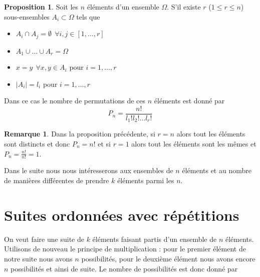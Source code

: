 \documentclass[a4paper,12pt]{report}
\theoremstyle{definition}
\renewcommand{\(}{\left(}
\renewcommand{\)}{\right)}
\newtheorem{rmk}[thm]{Remarque}
\newtheorem{prop}[thm]{Proposition}
\begin{document}
        \begin{leftbar}
        \begin{prop}
            Soit les $n$ éléments d'un ensemble $\Omega$. S'il existe $r$ ($1\leq r\leq n$) sous-ensembles $A_i\subset\Omega$ tels que 
            \begin{itemize}[label = \textbullet]
                \item $A_i\cap A_j = \emptyset~~ \forall i,j\in[1,\dots, r]$
                \item $A_1\cup\dots\cup A_r = \Omega$
                \item $ x=y~~\forall x,y\in A_i $ pour $i=1,\dots,r$
                \item  $|A_i| = l_i$ pour $i=1,\dots,r$
            \end{itemize}
            Dans ce cas le nombre de permutations de ces $n$ éléments est donné par
            $$P_n = \frac{n!}{l_1!l_2!\dots l_r!}$$
        \end{prop}
        \end{leftbar}
        
        \begin{rmk}
            Dans la proposition précédente, si $r = n$ alors tout les éléments sont distincts et donc $P_n = n!$ et si $r = 1$ alors tout les éléments sont les mêmes et $P_n = \frac{n!}{n!} = 1$.
        \end{rmk}
        
        Dans le suite nous nous intéresserons aux ensembles de $n$ éléments et au nombre de manières différentes de prendre $k$ éléments parmi les $n$.
        
    \section{Suites ordonnées avec répétitions}
    
        On veut faire une suite de $k$ éléments faisant partis d'un ensemble de $n$ éléments. Utilisons de nouveau le principe de multiplication : pour le premier élément de notre suite nous avons $n$ possibilités, pour le deuxième élément nous avons encore $n$ possibilités et ainsi de suite. Le nombre de possibilités est donc donné par
        
        \begin{center}
            \setlength{\fboxrule}{1pt}
        \end{center}
        
\end{document}
